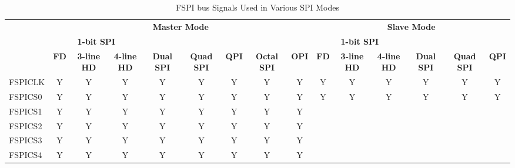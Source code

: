 \documentclass[main\_\_EN.tex]{subfiles}
\begin{document}
\begin{landscape}
\begin{table}[H]
    \centering
    \caption{FSPI bus Signals Used in Various SPI Modes}
    \label{tab:fspi-bus-singals-used-in-various-spi-modes}

    \begin{threeparttable}
    \begin{tabular}{ |p{2.0cm} |c|c|c|c|c|c|c|c|c|c|c|c|c|c| }
    \hline
        \rowcolor{lightgray}
        & \multicolumn{8}{c|}{\textbf{Master Mode}} & \multicolumn{6}{c|}{\textbf{Slave Mode}} \\\cline{2-15}
        \rowcolor{lightgray}
        & \multicolumn{3}{c|}{\textbf{1-bit SPI}} & & & & & & \multicolumn{3}{c|}{\textbf{1-bit SPI}} & & & \\ \cline{2-4} \cline{10-12}
        \rowcolor{lightgray}
        \multirow{-3}{*}{\textbf{FSPI Signal}} & \textbf{FD\tnote{1}} & \textbf{3-line HD\tnote{2}} & \textbf{4-line HD} & \multirow{-2}{*}{\textbf{Dual SPI}} & \multirow{-2}{*}{\textbf{Quad SPI}} & \multirow{-2}{*}{\textbf{QPI}} & \multirow{-2}{*}{\textbf{Octal SPI}} & \multirow{-2}{*}{\textbf{OPI}} & \textbf{FD} & \textbf{3-line HD} & \textbf{4-line HD} & \multirow{-2}{*}{\textbf{Dual SPI}} & \multirow{-2}{*}{\textbf{Quad SPI}} & \multirow{-2}{*}{\textbf{QPI}} \\ \hline
FSPICLK                  & Y       & Y       & Y       & Y       & Y       & Y      & Y       & Y      & Y       & Y      & Y       & Y       & Y       & Y      \\ \hline
FSPICS0                  & Y       & Y       & Y       & Y       & Y       & Y      & Y       & Y      & Y       & Y      & Y       & Y       & Y       & Y      \\ \hline
FSPICS1                  & Y       & Y       & Y       & Y       & Y       & Y      & Y       & Y      &         &        &         &         &         &        \\ \hline
FSPICS2                  & Y       & Y       & Y       & Y       & Y       & Y      & Y       & Y      &         &        &         &         &         &        \\ \hline
FSPICS3                  & Y       & Y       & Y       & Y       & Y       & Y      & Y       & Y      &         &        &         &         &         &        \\ \hline
FSPICS4                  & Y       & Y       & Y       & Y       & Y       & Y      & Y       & Y      &         &        &         &         &         &        \\ \hline

\end{tabular}
\end{threeparttable}
\end{table}
\end{landscape}
\end{document}
